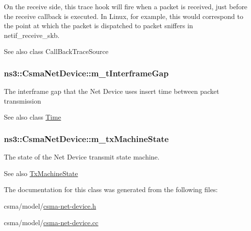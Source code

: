 On the receive side, this trace hook will fire when a packet is received, just before the receive callback is executed. In Linux, for example, this would correspond to the point at which the packet is dispatched to packet sniffers in netif\+\_\+receive\+\_\+skb.

\begin{DoxySeeAlso}{See also}
class Call\+Back\+Trace\+Source 
\end{DoxySeeAlso}
\subsubsection[{\texorpdfstring{m\+\_\+t\+Interframe\+Gap}{m_tInterframeGap}}]{ ns3\+::\+Csma\+Net\+Device\+::m\+\_\+t\+Interframe\+Gap\hspace{0.3cm}{\ttfamily [private]}}\hypertarget{classns3_1_1CsmaNetDevice_ae581d7910d91ab9aaf760288ccf75c55}{}\label{classns3_1_1CsmaNetDevice_ae581d7910d91ab9aaf760288ccf75c55}
The interframe gap that the Net Device uses insert time between packet transmission \begin{DoxySeeAlso}{See also}
class \hyperlink{classns3_1_1Time}{Time} 
\end{DoxySeeAlso}
\subsubsection[{\texorpdfstring{m\+\_\+tx\+Machine\+State}{m_txMachineState}}]{ ns3\+::\+Csma\+Net\+Device\+::m\+\_\+tx\+Machine\+State\hspace{0.3cm}{\ttfamily [private]}}\hypertarget{classns3_1_1CsmaNetDevice_af07031cad3f8bd8c4b33ba77fa706e99}{}\label{classns3_1_1CsmaNetDevice_af07031cad3f8bd8c4b33ba77fa706e99}
The state of the Net Device transmit state machine. \begin{DoxySeeAlso}{See also}
\hyperlink{classns3_1_1CsmaNetDevice_a46c532357164a954c46a01f05f8d78f4}{Tx\+Machine\+State} 
\end{DoxySeeAlso}


The documentation for this class was generated from the following files\+:\begin{DoxyCompactItemize}
\item 
csma/model/\hyperlink{csma-net-device_8h}{csma-\/net-\/device.\+h}\item 
csma/model/\hyperlink{csma-net-device_8cc}{csma-\/net-\/device.\+cc}\end{DoxyCompactItemize}
